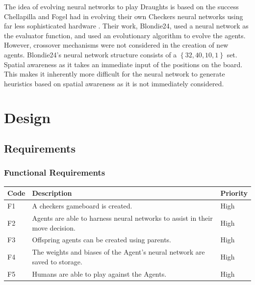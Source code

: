 \documentclass[12pt,a4paper]{article}
\begin{document}
    The idea of evolving neural networks to play Draughts is based on the success Chellapilla and Fogel had in evolving their own Checkers neural networks using far less sophisticated hardware \cite{chellapilla_evolving_1999}. Their work, Blondie24, used a neural network as the evaluator function, and used an evolutionary algorithm to evolve the agents.
    However, crossover mechanisms were not considered in the creation of new agents. Blondie24's neural network structure consists of a $\left\{ 32,40,10,1 \right\}$ set. Spatial awareness as it takes an immediate input of the positions on the board. This makes it inherently more difficult for the neural network to generate heuristics based on spatial awareness as it is not immediately considered.


\section{Design}

\subsection*{Requirements}

    \subsubsection*{Functional Requirements}

    \begin{center}
        \begin{tabular}{| l  | l | l |}
        \hline
        Code & Description & Priority \\ \hline
        F1 & A checkers gameboard is created.& High  \\ \hline
        F2 &  Agents are able to harness neural networks to assist in their move decision.& High  \\ \hline
        F3 &  Offspring agents can be created using parents. & High \\ \hline
        F4 &  The weights and biases of the Agent's neural network are saved to storage.& High  \\ \hline
        F5 &  Humans are able to play against the Agents. & High \\ \hline
        \end{tabular}
    \end{center}
\end{document}
